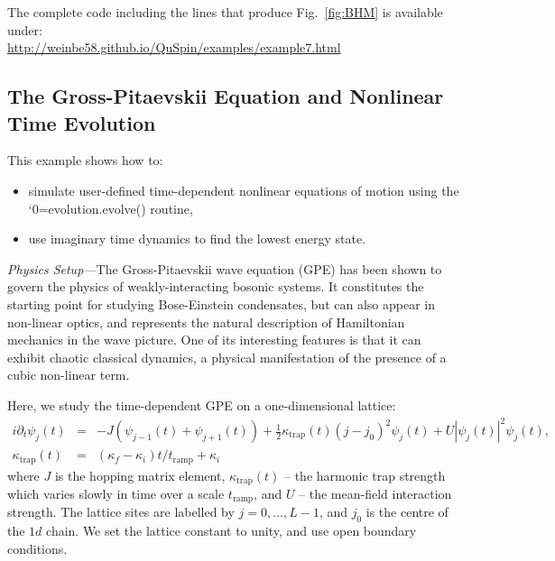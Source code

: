 \documentclass{SciPost}
\newcommand\0{\scalebox{-1}[1]{0}}
\let\svttfamily\ttfamily
\renewcommand\ttfamily{\svttfamily\catcode`0=\active }
\renewcommand\texttt{\bgroup\ttfamily\texttthelp}
\def\texttthelp#1{#1\egroup}
\begin{document}
The complete code including the lines that produce Fig.~\ref{fig:BHM} is available under:\\

\href{http://weinbe58.github.io/QuSpin/examples/example7.html}{http://weinbe58.github.io/QuSpin/examples/example7.html}\\

\subsection{The Gross-Pitaevskii Equation and Nonlinear Time Evolution}
\label{subsec:GP_dynamics}

This example shows how to:
\begin{itemize}
	\item simulate user-defined time-dependent nonlinear equations of motion using the \\ \texttt{evolution.evolve()} routine,
	\item use imaginary time dynamics to find the lowest energy state.
\end{itemize}

\noindent\emph{Physics Setup---}The Gross-Pitaevskii wave equation (GPE) has been shown to govern the physics of weakly-interacting bosonic systems. It constitutes the starting point for studying Bose-Einstein condensates, but can also appear in non-linear optics, and represents the natural description of Hamiltonian mechanics in the wave picture. One of its interesting features is that it can exhibit chaotic classical dynamics, a physical manifestation of the presence of a cubic non-linear term.

Here, we study the time-dependent GPE on a one-dimensional lattice:
\begin{eqnarray}
i\partial_t\psi_j(t) &=& -J\left( \psi_{j-1}(t) + \psi_{j+1}(t)\right) + \frac{1}{2}\kappa_\mathrm{trap}(t)(j-j_0)^2\psi_j(t) + U|\psi_j(t)|^2\psi_j(t), \nonumber \\
\kappa_\mathrm{trap}(t)&=&(\kappa_f-\kappa_i)t/t_\mathrm{ramp}+ \kappa_i
\label{eq:GPE}
\end{eqnarray}
where $J$ is the hopping matrix element, $\kappa_\mathrm{trap}(t)$ -- the harmonic trap strength which varies slowly in time over a scale $t_\mathrm{ramp}$, and $U$ -- the mean-field interaction strength. The lattice sites are labelled by $j=0,\dots,L-1$, and $j_0$ is the centre of the $1d$ chain. We set the lattice constant to unity, and use open boundary conditions.
\end{document}
